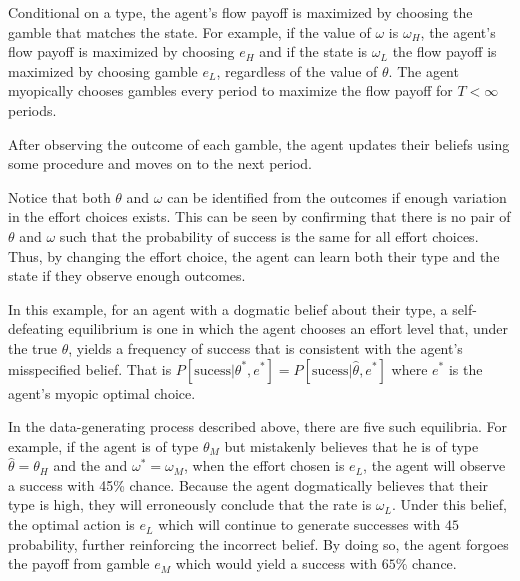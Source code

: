 \documentclass[
  12pt,
]{article}
\begin{document}
Conditional on a type, the agent's flow payoff is maximized by choosing
the gamble that matches the state. For example, if the value of
\(\omega\) is \(\omega_H\), the agent's flow payoff is maximized by
choosing \(e_H\) and if the state is \(\omega_L\) the flow payoff is
maximized by choosing gamble \(e_L\), regardless of the value of
\(\theta\). The agent myopically chooses gambles every period to
maximize the flow payoff for \(T<\infty\) periods.

After observing the outcome of each gamble, the agent updates their
beliefs using some procedure and moves on to the next period.

Notice that both \(\theta\) and \(\omega\) can be identified from the
outcomes if enough variation in the effort choices exists. This can be
seen by confirming that there is no pair of \(\theta\) and \(\omega\)
such that the probability of success is the same for all effort choices.
Thus, by changing the effort choice, the agent can learn both their type
and the state if they observe enough outcomes.

In this example, for an agent with a dogmatic belief about their type, a
self-defeating equilibrium is one in which the agent chooses an effort
level that, under the true \(\theta\), yields a frequency of success
that is consistent with the agent's misspecified belief. That is
\(P[\text{sucess}|\theta^*, e^*] = P[\text{sucess}|\hat{\theta}, e^*]\)
where \(e^*\) is the agent's myopic optimal choice.

In the data-generating process described above, there are five such
equilibria. For example, if the agent is of type \(\theta_M\) but
mistakenly believes that he is of type \(\hat{\theta}=\theta_H\) and the
and \(\omega^* = \omega_M\), when the effort chosen is \(e_L\), the
agent will observe a success with 45\% chance. Because the agent
dogmatically believes that their type is high, they will erroneously
conclude that the rate is \(\omega_L\). Under this belief, the optimal
action is \(e_L\) which will continue to generate successes with \(45%
\) probability, further reinforcing the incorrect belief. By doing so,
the agent forgoes the payoff from gamble \(e_M\) which would yield a
success with \(65\%\) chance.
\end{document}
